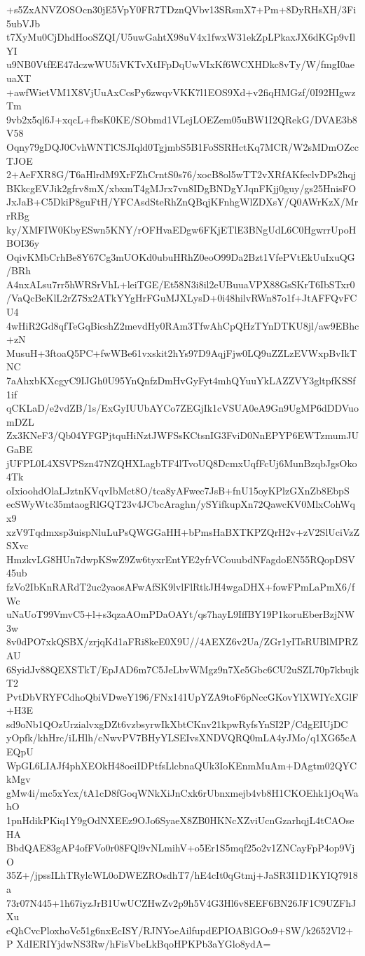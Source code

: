 +s5ZxANVZOSOcn30jE5VpY0FR7TDznQVbv13SRsmX7+Pm+8DyRHsXH/3Fi5ubVJb
t7XyMu0CjDhdHooSZQI/U5uwGahtX98uV4x1fwxW31ekZpLPkaxJX6dKGp9vIlYI
u9NB0VtfEE47dczwWU5iVKTvXtIFpDqUwVIxKf6WCXHDkc8vTy/W/fmgI0aeuaXT
+awfWietVM1X8VjUuAxCcsPy6zwqvVKK7l1EOS9Xd+v2fiqHMGzf/0I92HIgwzTm
9vb2x5ql6J+xqcL+fbsK0KE/SObmd1VLejLOEZem05uBW1I2QRekG/DVAE3b8V58
Oqny79gDQJ0CvhWNTlCSJIqld0TgjmbS5B1FoSSRHctKq7MCR/W2sMDmOZccTJOE
2+AeFXR8G/T6aHlrdM9XrFZhCrntS0s76/xocB8ol5wTT2vXRfAKfeclvDPs2hqj
BKkcgEVJik2gfrv8mX/xbxmT4gMJrx7vn8IDgBNDgYJqnFKjj0guy/gs25HnisFO
JxJaB+C5DkiP8guFtH/YFCAsdSteRhZnQBqjKFnhgWlZDXsY/Q0AWrKzX/MrrRBg
ky/XMFIW0KbyESwn5KNY/rOFHvaEDgw6FKjETlE3BNgUdL6C0HgwrrUpoHBOI36y
OqivKMbCrhBe8Y67Cg3mUOKd0ubuHRhZ0eoO99Da2Bzt1VfePVtEkUuIxuQG/BRh
A4nxALsu7rr5hWRSrVhL+leiTGE/Et58N3i8il2eUBuuaVPX88GsSKrT6IbSTxr0
/VaQcBeKlL2rZ7Sx2ATkYYgHrFGuMJXLysD+0i48hilvRWn87o1f+JtAFFQvFCU4
4wHiR2Gd8qfTeGqBicshZ2mevdHy0RAm3TfwAhCpQHzTYnDTKU8jl/aw9EBhc+zN
MusuH+3ftoaQ5PC+fwWBe61vxskit2hYs97D9AqjFjw0LQ9uZZLzEVWxpBvIkTNC
7aAhxbKXcgyC9IJGh0U95YnQnfzDmHvGyFyt4mhQYuuYkLAZZVY3gltpfKSSf1if
qCKLaD/e2vdZB/1s/ExGyIUUbAYCo7ZEGjIk1cVSUA0eA9Gn9UgMP6dDDVuomDZL
Zx3KNeF3/Qb04YFGPjtquHiNztJWFSsKCtsnIG3FviD0NnEPYP6EWTzmumJUGaBE
jUFPL0L4XSVPSzn47NZQHXLagbTF4lTvoUQ8DcmxUqfFcUj6MunBzqbJgsOko4Tk
oIxioohdOlaLJztnKVqvIbMct8O/tca8yAFwec7JsB+fnU15oyKPlzGXnZb8EbpS
ecSWyWtc35mtaogRlGQT23v4JCbcAraghn/ySYifkupXn72QawcKV0MlxCohWqx9
xzV9Tqdmxsp3uispNluLuPsQWGGaHH+bPmsHaBXTKPZQrH2v+zV2SlUciVzZSXvc
HmzkvLG8HUn7dwpKSwZ9Zw6tyxrEntYE2yfrVCouubdNFagdoEN55RQopDSV45ub
fzVo2IbKnRARdT2uc2yaosAFwAfSK9lvlFlRtkJH4wgaDHX+fowFPmLaPmX6/fWc
uNaUoT99VmvC5+l+s3qzaAOmPDaOAYt/qs7hayL9IffBY19P1koruEberBzjNW3w
8v0dPO7xkQSBX/zrjqKd1aFRi8keE0X9U//4AEXZ6v2Ua/ZGr1yITsRUBlMPRZAU
6SyidJv88QEXSTkT/EpJAD6m7C5JeLbvWMgz9n7Xe5Gbc6CU2uSZL70p7kbujkT2
PvtDbVRYFCdhoQbiVDweY196/FNx141UpYZA9toF6pNccGKovYlXWIYcXGlF+H3E
sd9oNb1QOzUrzialvxgDZt6vzbsyrwIkXbtCKnv21kpwRyfsYnSI2P/CdgEIUjDC
yOpfk/khHrc/iLHlh/cNwvPV7BHyYLSEIvsXNDVQRQ0mLA4yJMo/q1XG65cAEQpU
WpGL6LIAJf4phXEOkH48oeiIDPtfsLlcbnaQUk3IoKEnmMuAm+DAgtm02QYCkMgv
gMw4i/mc5xYcx/tA1cD8fGoqWNkXiJnCxk6rUbnxmejb4vb8H1CKOEhk1jOqWahO
1pnHdikPKiq1Y9gOdNXEEz9OJo6SyaeX8ZB0HKNcXZviUcnGzarhqjL4tCAOseHA
BbdQAE83gAP4ofFVo0r08FQl9vNLmihV+o5Er1S5mqf25o2v1ZNCayFpP4op9VjO
35Z+/jpssILhTRylcWL0oDWEZROsdhT7/hE4cIt0qGtmj+JaSR3I1D1KYIQ7918a
73r07N445+1h67iyzJrB1UwUCZHwZv2p9h5V4G3Hl6v8EEF6BN26JF1C9UZFhJXu
eQhCvcPloxhoVc51g6nxEcISY/RJNYoeAilfupdEPIOABlGOo9+SW/k2652Vl2+P
XdIERIYjdwNS3Rw/hFisVbeLkBqoHPKPb3aYGlo8ydA=
